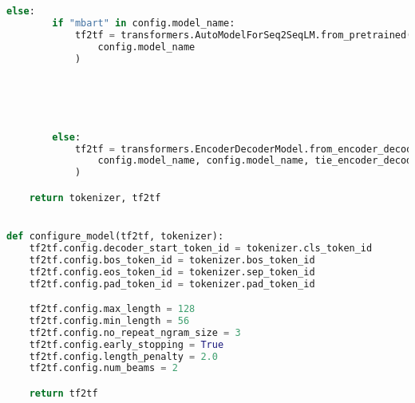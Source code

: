 \begin{lstlisting}[language=Python, caption=Hilfsmethoden]
    else:
        if "mbart" in config.model_name:
            tf2tf = transformers.AutoModelForSeq2SeqLM.from_pretrained(
                config.model_name
            )





        else:
            tf2tf = transformers.EncoderDecoderModel.from_encoder_decoder_pretrained(
                config.model_name, config.model_name, tie_encoder_decoder=True
            )

    return tokenizer, tf2tf


def configure_model(tf2tf, tokenizer):
    tf2tf.config.decoder_start_token_id = tokenizer.cls_token_id
    tf2tf.config.bos_token_id = tokenizer.bos_token_id
    tf2tf.config.eos_token_id = tokenizer.sep_token_id
    tf2tf.config.pad_token_id = tokenizer.pad_token_id

    tf2tf.config.max_length = 128
    tf2tf.config.min_length = 56
    tf2tf.config.no_repeat_ngram_size = 3
    tf2tf.config.early_stopping = True
    tf2tf.config.length_penalty = 2.0
    tf2tf.config.num_beams = 2

    return tf2tf
\end{lstlisting}
\newpage


